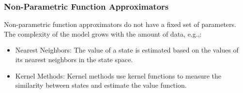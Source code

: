 \subsubsection{Non-Parametric Function Approximators}
Non-parametric function approximators do not have a fixed set of parameters. The complexity of the model grows with the amount of data, e.g.,:
\begin{itemize}
    \item Nearest Neighbors: The value of a state is estimated based on the values of its nearest neighbors in the state space.
    \item Kernel Methods: Kernel methods use kernel functions to measure the similarity between states and estimate the value function.
\end{itemize}
